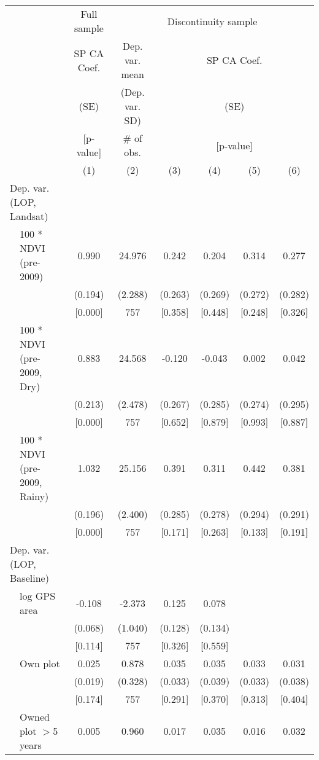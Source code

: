 \begin{tabular}{llcccccc}
\hline \hline
 & & \multicolumn{1}{c}{Full sample} & \multicolumn{5}{c}{Discontinuity sample} \\
\cmidrule(lr){3-3}\cmidrule(lr){4-8}
 & & \multicolumn{1}{c}{SP CA Coef.} & Dep. var. mean & \multicolumn{4}{c}{SP CA Coef.} \\
 & & \multicolumn{1}{c}{(SE)} & (Dep. var. SD) & \multicolumn{4}{c}{(SE)} \\
 & & \multicolumn{1}{c}{[p-value]} & \# of obs. & \multicolumn{4}{c}{[p-value]} \\
\cmidrule(lr){3-3}\cmidrule(lr){5-8}
 & & (1) & (2) & (3) & (4) & (5) & (6) \\
\hline
\multicolumn{2}{l}{Dep. var. (LOP, Landsat)} & & & & & & \\
\cmidrule(lr){1-2}
 & 100 * NDVI (pre-2009) & 0.990 & 24.976 & 0.242 & 0.204 & 0.314 & 0.277 \\
 & & (0.194) & (2.288) & (0.263) & (0.269) & (0.272) & (0.282) \\
 & & [0.000] & 757 & [0.358] & [0.448] & [0.248] & [0.326] \\[0.5em]
 & 100 * NDVI (pre-2009, Dry) & 0.883 & 24.568 & -0.120 & -0.043 & 0.002 & 0.042 \\
 & & (0.213) & (2.478) & (0.267) & (0.285) & (0.274) & (0.295) \\
 & & [0.000] & 757 & [0.652] & [0.879] & [0.993] & [0.887] \\[0.5em]
 & 100 * NDVI (pre-2009, Rainy) & 1.032 & 25.156 & 0.391 & 0.311 & 0.442 & 0.381 \\
 & & (0.196) & (2.400) & (0.285) & (0.278) & (0.294) & (0.291) \\
 & & [0.000] & 757 & [0.171] & [0.263] & [0.133] & [0.191] \\[0.5em]
\multicolumn{2}{l}{Dep. var. (LOP, Baseline)} & & & & & &  \\
\cmidrule(lr){1-2}
 & log GPS area & -0.108 & -2.373 & 0.125 & 0.078 &  &  \\
 & & (0.068) & (1.040) & (0.128) & (0.134) &  &  \\
 & & [0.114] & 757 & [0.326] & [0.559] &  &  \\[0.5em]
 & Own plot & 0.025 & 0.878 & 0.035 & 0.035 & 0.033 & 0.031 \\
 & & (0.019) & (0.328) & (0.033) & (0.039) & (0.033) & (0.038) \\
 & & [0.174] & 757 & [0.291] & [0.370] & [0.313] & [0.404] \\[0.5em]
 & Owned plot $>$5 years & 0.005 & 0.960 & 0.017 & 0.035 & 0.016 & 0.032 \\

\end{tabular}
